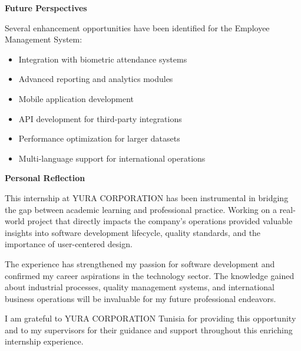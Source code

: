 \vspace{0.5cm}

\noindent \textbf{Future Perspectives}

Several enhancement opportunities have been identified for the Employee Management System:
\begin{itemize}
    \item Integration with biometric attendance systems
    \item Advanced reporting and analytics modules
    \item Mobile application development
    \item API development for third-party integrations
    \item Performance optimization for larger datasets
    \item Multi-language support for international operations
\end{itemize}

\vspace{0.5cm}

\noindent \textbf{Personal Reflection}

This internship at YURA CORPORATION has been instrumental in bridging the gap between academic learning and professional practice. Working on a real-world project that directly impacts the company's operations provided valuable insights into software development lifecycle, quality standards, and the importance of user-centered design.

The experience has strengthened my passion for software development and confirmed my career aspirations in the technology sector. The knowledge gained about industrial processes, quality management systems, and international business operations will be invaluable for my future professional endeavors.

\vspace{0.5cm}

\noindent I am grateful to YURA CORPORATION Tunisia for providing this opportunity and to my supervisors for their guidance and support throughout this enriching internship experience.
